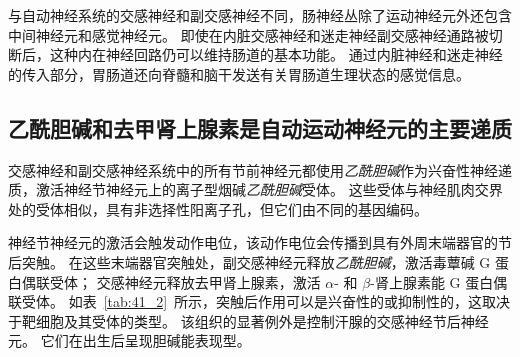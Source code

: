 与自动神经系统的交感神经和副交感神经不同，肠神经丛除了运动神经元外还包含中间神经元和感觉神经元。
即使在内脏交感神经和迷走神经副交感神经通路被切断后，这种内在神经回路仍可以维持肠道的基本功能。
通过内脏神经和迷走神经的传入部分，胃肠道还向脊髓和脑干发送有关胃肠道生理状态的感觉信息。



\subsection{乙酰胆碱和去甲肾上腺素是自动运动神经元的主要递质}

交感神经和副交感神经系统中的所有节前神经元都使用\textit{乙酰胆碱}作为兴奋性神经递质，激活神经节神经元上的离子型烟碱\textit{乙酰胆碱}受体。
这些受体与神经肌肉交界处的受体相似，具有非选择性阳离子孔，但它们由不同的基因编码。


神经节神经元的激活会触发动作电位，该动作电位会传播到具有外周末端器官的节后突触。
在这些末端器官突触处，副交感神经元释放\textit{乙酰胆碱}，激活毒蕈碱 G 蛋白偶联受体；
交感神经元释放去甲肾上腺素，激活 $\alpha$- 和 $\beta$-肾上腺素能 G 蛋白偶联受体。
如表~\ref{tab:41_2}~所示，突触后作用可以是兴奋性的或抑制性的，这取决于靶细胞及其受体的类型。
该组织的显著例外是控制汗腺的交感神经节后神经元。
它们在出生后呈现胆碱能表现型。


